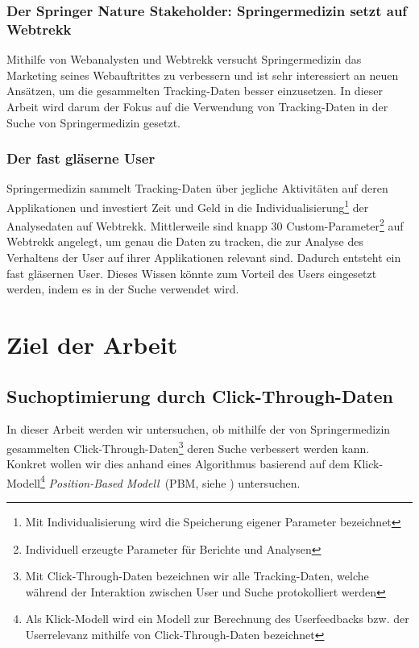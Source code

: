 \subsubsection{Der Springer Nature Stakeholder: Springermedizin setzt auf Webtrekk}
\label{sec:Einfuehrung:Problemstellung:Springermedizin}

Mithilfe von Webanalysten und Webtrekk versucht Springermedizin das Marketing seines Webauftrittes zu verbessern und ist sehr interessiert an neuen Ansätzen, um die gesammelten Tracking-Daten besser einzusetzen. In dieser Arbeit wird darum der Fokus auf die Verwendung von Tracking-Daten in der Suche von Springermedizin gesetzt. 
 
\subsubsection{Der fast gläserne User}
\label{sec:Einfuehrung:Problemstellung:Glaeserne-User}

Springermedizin sammelt Tracking-Daten über jegliche Aktivitäten auf deren Applikationen und investiert Zeit und Geld in die Individualisierung\footnote{Mit Individualisierung wird die Speicherung eigener Parameter bezeichnet} der Analysedaten auf Webtrekk. Mittlerweile sind knapp 30 Custom-Parameter\footnote{Individuell erzeugte Parameter für Berichte und Analysen} auf Webtrekk angelegt, um genau die Daten zu tracken, die zur Analyse des Verhaltens der User auf ihrer Applikationen relevant sind. Dadurch entsteht ein fast \glqq gläsernen User\grqq{}. Dieses Wissen könnte zum Vorteil des Users eingesetzt werden, indem es in der Suche verwendet wird.

\pagebreak
\section{Ziel der Arbeit}
\label{sec:Einfuehrung:ZielArbeit}

\subsection{Suchoptimierung durch Click-Through-Daten}
\label{sec:Einfuehrung:ZielArbeit:Suchoptimierung}

In dieser Arbeit werden wir untersuchen, ob mithilfe der von Springermedizin gesammelten Click-Through-Daten\footnote{Mit Click-Through-Daten bezeichnen wir alle Tracking-Daten, welche während der Interaktion zwischen User und Suche protokolliert werden} deren Suche verbessert werden kann. Konkret wollen wir dies anhand eines Algorithmus basierend auf dem Klick-Modell\footnote{Als Klick-Modell wird ein Modell zur Berechnung des Userfeedbacks bzw. der Userrelevanz mithilfe von Click-Through-Daten bezeichnet} \textit{Position-Based Modell}~(PBM, siehe \cite{pbm}) untersuchen.

